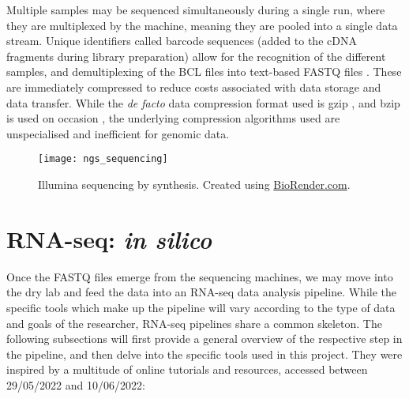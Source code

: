 Multiple samples may be sequenced simultaneously during a single run, where they are multiplexed by the machine, meaning they are pooled into a single data stream. Unique identifiers called barcode sequences (added to the cDNA fragments during library preparation) allow for the recognition of the different samples, and demultiplexing of the BCL files into text-based FASTQ files \citep{cock2010sanger}. These are immediately compressed to reduce costs associated with data storage and data transfer. While the \textit{de facto} data compression format used is gzip \citep{deutsch1996gzip}, and bzip is used on occasion \citep{seward1996bzip2}, the underlying compression algorithms used are unspecialised and inefficient for genomic data.

\begin{figure}[!h]
    \centering
    \texttt{[image: ngs\_sequencing]}
    \caption[Sequencing by synthesis]{Illumina sequencing by synthesis. Created using \href{https://biorender.com/}{BioRender.com}. } 
    \label{fig:ngs_sequencing}
\end{figure}





\clearpage
\section{RNA-seq: \textit{in silico}}
\label{RNA-seq: in silico}

Once the FASTQ files emerge from the sequencing machines, we may move into the dry lab and feed the data into an RNA-seq data analysis pipeline. While the specific tools which make up the pipeline will vary according to the type of data and goals of the researcher, RNA-seq pipelines share a common skeleton. The following subsections will first provide a general overview of the respective step in the pipeline, and then delve into the specific tools used in this project. They were inspired by a multitude of online tutorials and resources, accessed between 29/05/2022 and 10/06/2022:

